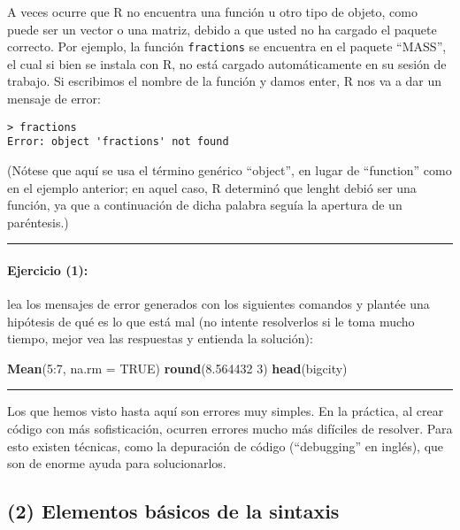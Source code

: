 \documentclass[]{article}
\newenvironment{Shaded}{}{}
\newcommand{\KeywordTok}[1]{\textcolor[rgb]{0.00,0.44,0.13}{\textbf{{#1}}}}
\newcommand{\DataTypeTok}[1]{\textcolor[rgb]{0.56,0.13,0.00}{{#1}}}
\newcommand{\DecValTok}[1]{\textcolor[rgb]{0.25,0.63,0.44}{{#1}}}
\newcommand{\FloatTok}[1]{\textcolor[rgb]{0.25,0.63,0.44}{{#1}}}
\newcommand{\OtherTok}[1]{\textcolor[rgb]{0.00,0.44,0.13}{{#1}}}
\newcommand{\NormalTok}[1]{{#1}}
\begin{document}
A veces ocurre que R no encuentra una función u otro tipo de objeto,
como puede ser un vector o una matriz, debido a que usted no ha cargado
el paquete correcto. Por ejemplo, la función \texttt{fractions} se
encuentra en el paquete ``MASS'', el cual si bien se instala con R, no
está cargado automáticamente en su sesión de trabajo. Si escribimos el
nombre de la función y damos enter, R nos va a dar un mensaje de error:

\begin{verbatim}
> fractions
Error: object 'fractions' not found
\end{verbatim}
(Nótese que aquí se usa el término genérico ``object'', en lugar de
``function'' como en el ejemplo anterior; en aquel caso, R determinó que
lenght debió ser una función, ya que a continuación de dicha palabra
seguía la apertura de un paréntesis.)

\begin{center}\rule{3in}{0.4pt}\end{center}

\paragraph{Ejercicio (1):}

lea los mensajes de error generados con los siguientes comandos y
plantée una hipótesis de qué es lo que está mal (no intente resolverlos
si le toma mucho tiempo, mejor vea las respuestas y entienda la
solución):

\begin{Shaded}
\begin{Highlighting}[]
\KeywordTok{Mean}\NormalTok{(}\DecValTok{5}\NormalTok{:}\DecValTok{7}\NormalTok{, }\DataTypeTok{na.rm =} \OtherTok{TRUE}\NormalTok{)}
\KeywordTok{round}\NormalTok{(}\FloatTok{8.564432} \DecValTok{3}\NormalTok{)}
\KeywordTok{head}\NormalTok{(bigcity)}
\end{Highlighting}
\end{Shaded}
\begin{center}\rule{3in}{0.4pt}\end{center}

Los que hemos visto hasta aquí son errores muy simples. En la práctica,
al crear código con más sofisticación, ocurren errores mucho más
difíciles de resolver. Para esto existen técnicas, como la depuración de
código (``debugging'' en inglés), que son de enorme ayuda para
solucionarlos.

\subsection{(2) Elementos básicos de la sintaxis}
\end{document}
